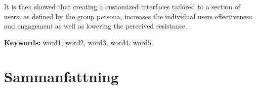 \documentclass[a4paper,11pt]{article}
\begin{document}
  It is then showed that creating a customized interfaces tailored to a section
  of users, as defined by the group persona, increases the individual users
  effectiveness and engagement as well as lowering the perceived resistance.


  \textbf{Keywords:} word1, word2, word3, word4, word5.


\clearpage

\section*{Sammanfattning}
\end{document}
